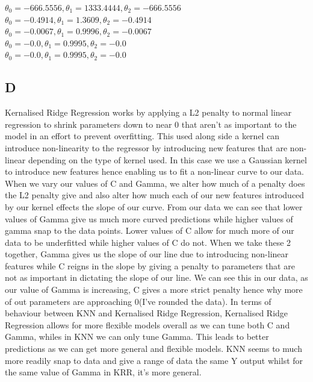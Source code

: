 \documentclass[11pt]{article} %
\begin{document}
\begin{figure}[h]
\qquad
{}
\end{figure}
\(\theta_0= -666.5556, \theta_1= 1333.4444 , \theta_2= -666.5556\)\\
\(\theta_0= -0.4914, \theta_1= 1.3609 , \theta_2= -0.4914\)\\
\(\theta_0= -0.0067, \theta_1= 0.9996 , \theta_2= -0.0067\)\\
\(\theta_0= -0.0, \theta_1= 0.9995 , \theta_2= -0.0\)\\
\(\theta_0= -0.0, \theta_1= 0.9995 , \theta_2= -0.0\)\\

\clearpage
\subsection{D}
Kernalised Ridge Regression works by applying a L2 penalty to normal linear regression to shrink parameters down to near 0 that aren't as important to the model in an effort to prevent overfitting. This used along side a kernel can introduce non-linearity to the regressor by introducing new features that are non-linear depending on the type of kernel used. In this case we use a Gaussian kernel to introduce new features hence enabling us to fit a non-linear curve to our data. When we vary our values of C and Gamma, we alter how much of a penalty does the L2 penalty give and also alter how much each of our new features introduced by our kernel effects the slope of our curve. From our data we can see that lower values of Gamma give us much more curved predictions while higher values of gamma snap to the data points. Lower values of C allow for much more of our data to be underfitted while higher values of C do not. When we take these 2 together, Gamma gives us the slope of our line due to introducing non-linear features while C reigns in the slope by giving a penalty to parameters that are not as important in dictating the slope of our line. We can see this in our data, as our value of Gamma is increasing, C gives a more strict penalty hence why more of out parameters are approaching 0(I've rounded the data).  In terms of behaviour between KNN and Kernalised Ridge Regression, Kernalised Ridge Regression allows for more flexible models overall as we can tune both C and Gamma, whiles in KNN we can only tune Gamma. This leads to better predictions as we can get more general and flexible models. KNN seems to much more readily snap to data and give a range of data the same Y output whilst for the same value of Gamma in KRR, it's more general. 
\clearpage
\end{document}
